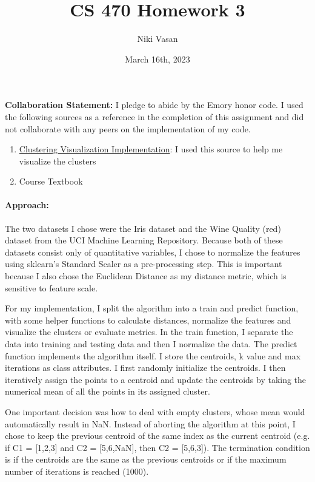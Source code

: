 \documentclass{article}
\title{CS 470 Homework 3}
\author{Niki Vasan}
\date{March 16th, 2023}
\begin{document}
\maketitle

\textbf{Collaboration Statement:} I pledge to abide by the Emory honor code. I used the following sources as a reference in the completion of this assignment and did not collaborate with any peers on the implementation of my code. 
\begin{enumerate}
    \item \href{https://github.com/Theob0t/Medium/blob/master/K-means-implementation.ipynb}{Clustering Visualization Implementation}: I used this source to help me visualize the clusters
    \item Course Textbook
\end{enumerate} 

\paragraph{\textbf{Approach:}} The two datasets I chose were the Iris dataset and the Wine Quality (red) dataset from the UCI Machine Learning Repository. Because both of these datasets consist only of quantitative variables, I chose to normalize the features using sklearn's Standard Scaler as a pre-processing step. This is important because I also chose the Euclidean Distance as my distance metric, which is sensitive to feature scale.  

For my implementation, I split the algorithm into a train and predict function, with some helper functions to calculate distances, normalize the features and visualize the clusters or evaluate metrics. In the train function, I separate the data into training and testing data and then I normalize the data. The predict function implements the algorithm itself. I store the centroids, k value and max iterations as class attributes. I first randomly initialize the centroids. I then iteratively assign the points to a centroid and update the centroids by taking the numerical mean of all the points in its assigned cluster.

One important decision was how to deal with empty clusters, whose mean would automatically result in NaN. Instead of aborting the algorithm at this point, I chose to keep the previous centroid of the same index as the current centroid (e.g. if C1 = [1,2,3] and C2 = [5,6,NaN], then C2 = [5,6,3]). The termination condition is if the centroids are the same as the previous centroids or if the maximum number of iterations is reached (1000).
\end{document}

